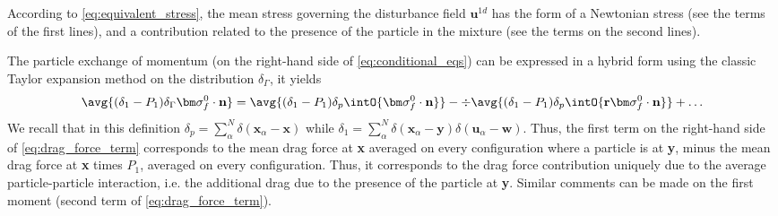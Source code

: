 According to \ref{eq:equivalent_stress}, the mean stress governing the disturbance field $\textbf{u}^{1d}$ has the form of a Newtonian stress (see the terms of the first lines), and a contribution related to the presence of the particle in the mixture (see the terms on the second lines). 

The particle exchange of momentum (on the right-hand side of \ref{eq:conditional_eqs}) can be expressed in a hybrid form using the classic Taylor expansion method on the distribution $\delta_\Gamma$, it yields 
\begin{equation}
    \avg{ (\delta_1 - P_1) \delta_\Gamma \bm\sigma_f^0\cdot \textbf{n}}
    = \avg{ (\delta_1 - P_1) \delta_p \intO{\bm\sigma_f^0\cdot \textbf{n}}}
    - \div \avg{ (\delta_1 - P_1) \delta_p \intO{\textbf{r}\bm\sigma_f^0\cdot \textbf{n}}}
    + \ldots
    \label{eq:drag_force_term}
\end{equation}
We recall that in this definition $\delta_p = \sum_\alpha^N\delta(\textbf{x}_\alpha - \textbf{x})$ while $\delta_1 = \sum_\alpha^N\delta(\textbf{x}_\alpha - \textbf{y})\delta(\textbf{u}_\alpha - \textbf{w})$.  
Thus, the first term on the right-hand side of \ref{eq:drag_force_term} corresponds to the mean drag force at \textbf{x} averaged on every configuration where a particle is at \textbf{y}, minus the mean drag force at \textbf{x} times $P_1$, averaged on every configuration. 
Thus, it corresponds to the drag force contribution uniquely due to the average particle-particle interaction, i.e. the additional drag due to the presence of the particle at \textbf{y}. 
Similar comments can be made on the first moment (second term of \ref{eq:drag_force_term}). 

